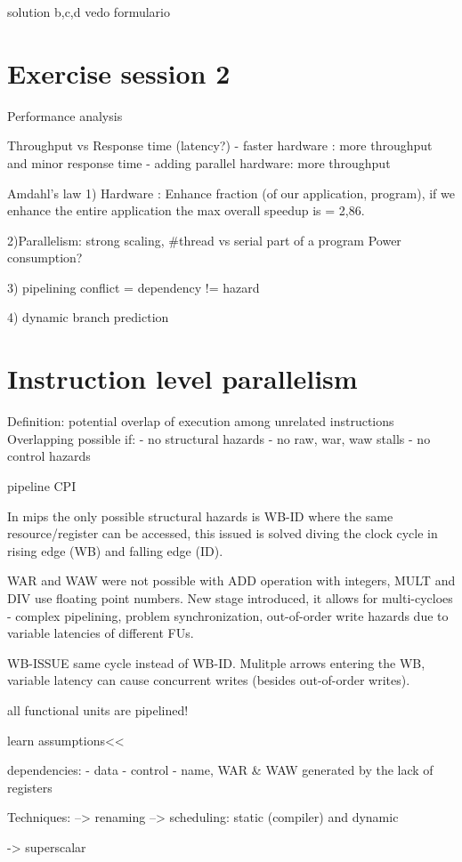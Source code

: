 solution b,c,d vedo formulario


\section{Exercise session 2}\label{sec:exercise-session-2}
Performance analysis

Throughput vs Response time (latency?)
- faster hardware : more throughput and minor response time
- adding parallel hardware: more throughput

Amdahl's law
1) Hardware : Enhance fraction (of our application, program), if we enhance the entire application the max overall
speedup is = 2,86.

2)Parallelism: strong scaling, #thread vs serial part of a program
Power consumption?

3) pipelining
conflict = dependency != hazard

4) dynamic branch prediction


\section{Instruction level parallelism}\label{sec:instruction-level-parallelism}
Definition: potential overlap of execution among unrelated instructions
Overlapping possible if:
- no structural hazards
- no raw, war, waw stalls
- no control hazards

pipeline CPI

In mips the only possible structural hazards is WB-ID where the same resource/register can be accessed,
this issued is solved diving the clock cycle in rising edge (WB) and falling edge (ID).

WAR and WAW were not possible with ADD operation with integers, MULT and DIV use floating point numbers.
New stage introduced, it allows for multi-cycloes - complex pipelining, problem synchronization, out-of-order write
hazards due to variable latencies of different FUs.

WB-ISSUE same cycle instead of WB-ID\@.
Mulitple arrows entering the WB, variable latency can cause concurrent writes (besides out-of-order writes).

all functional units are pipelined!

learn assumptions<<

dependencies:
- data
- control
- name, WAR & WAW generated by the lack of registers

Techniques:
--> renaming
--> scheduling: static (compiler) and dynamic

-> superscalar


